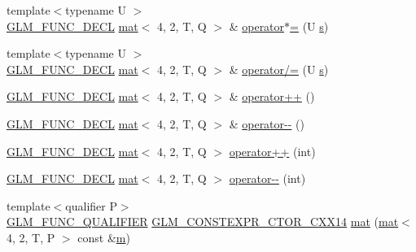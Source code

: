 \begin{DoxyCompactItemize}
\item 
{\footnotesize template$<$typename U $>$ }\\\mbox{\hyperlink{setup_8hpp_ab2d052de21a70539923e9bcbf6e83a51}{G\+L\+M\+\_\+\+F\+U\+N\+C\+\_\+\+D\+E\+CL}} \mbox{\hyperlink{structglm_1_1mat}{mat}}$<$ 4, 2, T, Q $>$ \& \mbox{\hyperlink{structglm_1_1mat_3_014_00_012_00_01_t_00_01_q_01_4_a4e8ca47ff05d03dd3ed84685dc401376}{operator$\ast$=}} (U \mbox{\hyperlink{_s_d_l__opengl_8h_a4af680a6c683f88ed67b76f207f2e6e4}{s}})
\item 
{\footnotesize template$<$typename U $>$ }\\\mbox{\hyperlink{setup_8hpp_ab2d052de21a70539923e9bcbf6e83a51}{G\+L\+M\+\_\+\+F\+U\+N\+C\+\_\+\+D\+E\+CL}} \mbox{\hyperlink{structglm_1_1mat}{mat}}$<$ 4, 2, T, Q $>$ \& \mbox{\hyperlink{structglm_1_1mat_3_014_00_012_00_01_t_00_01_q_01_4_aa1a9ec4ecebe060e0d61b07cbde4c234}{operator/=}} (U \mbox{\hyperlink{_s_d_l__opengl_8h_a4af680a6c683f88ed67b76f207f2e6e4}{s}})
\item 
\mbox{\hyperlink{setup_8hpp_ab2d052de21a70539923e9bcbf6e83a51}{G\+L\+M\+\_\+\+F\+U\+N\+C\+\_\+\+D\+E\+CL}} \mbox{\hyperlink{structglm_1_1mat}{mat}}$<$ 4, 2, T, Q $>$ \& \mbox{\hyperlink{structglm_1_1mat_3_014_00_012_00_01_t_00_01_q_01_4_a973f220e1471a6dd869ce2b5eb569bfa}{operator++}} ()
\item 
\mbox{\hyperlink{setup_8hpp_ab2d052de21a70539923e9bcbf6e83a51}{G\+L\+M\+\_\+\+F\+U\+N\+C\+\_\+\+D\+E\+CL}} \mbox{\hyperlink{structglm_1_1mat}{mat}}$<$ 4, 2, T, Q $>$ \& \mbox{\hyperlink{structglm_1_1mat_3_014_00_012_00_01_t_00_01_q_01_4_adffff37695848dddf217654fbbd42862}{operator-\/-\/}} ()
\item 
\mbox{\hyperlink{setup_8hpp_ab2d052de21a70539923e9bcbf6e83a51}{G\+L\+M\+\_\+\+F\+U\+N\+C\+\_\+\+D\+E\+CL}} \mbox{\hyperlink{structglm_1_1mat}{mat}}$<$ 4, 2, T, Q $>$ \mbox{\hyperlink{structglm_1_1mat_3_014_00_012_00_01_t_00_01_q_01_4_ae81f2be5be6e25c0b903442b0ec65d9c}{operator++}} (int)
\item 
\mbox{\hyperlink{setup_8hpp_ab2d052de21a70539923e9bcbf6e83a51}{G\+L\+M\+\_\+\+F\+U\+N\+C\+\_\+\+D\+E\+CL}} \mbox{\hyperlink{structglm_1_1mat}{mat}}$<$ 4, 2, T, Q $>$ \mbox{\hyperlink{structglm_1_1mat_3_014_00_012_00_01_t_00_01_q_01_4_a3fb0499b3c4e78d4d52ad9ee06146c06}{operator-\/-\/}} (int)
\item 
{\footnotesize template$<$qualifier P$>$ }\\\mbox{\hyperlink{setup_8hpp_a33fdea6f91c5f834105f7415e2a64407}{G\+L\+M\+\_\+\+F\+U\+N\+C\+\_\+\+Q\+U\+A\+L\+I\+F\+I\+ER}} \mbox{\hyperlink{setup_8hpp_a0900f9145e68bf6061b6f5e7be3fa751}{G\+L\+M\+\_\+\+C\+O\+N\+S\+T\+E\+X\+P\+R\+\_\+\+C\+T\+O\+R\+\_\+\+C\+X\+X14}} \mbox{\hyperlink{structglm_1_1mat_3_014_00_012_00_01_t_00_01_q_01_4_a780dbdda12c004d1894b31daede7e9ce}{mat}} (\mbox{\hyperlink{structglm_1_1mat}{mat}}$<$ 4, 2, T, P $>$ const \&\mbox{\hyperlink{_s_d_l__opengl__glext_8h_af593500c283bf1a787a6f947f503a5c2}{m}})

\end{DoxyCompactItemize}
